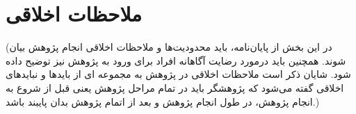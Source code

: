 \section{ملاحظات اخلاقی}
(در این بخش از پایان‌نامه، باید محدودیت‌ها و ملاحظات اخلاقی انجام پژوهش بیان شوند. همچنین باید درمورد رضایت آگاهانه افراد برای ورود به پژوهش نیز توضیح داده شود. شایان ذکر است ملاحظات اخلاقی در پژوهش به مجموعه ای از بایدها و نبایدهای اخلاقی گفته‌ می‌شود که پژوهشگر باید در تمام مراحل پژوهش یعنی قبل از شروع به انجام پژوهش، در طول انجام پژوهش و بعد از اتمام پژوهش بدان پایبند باشد.)

